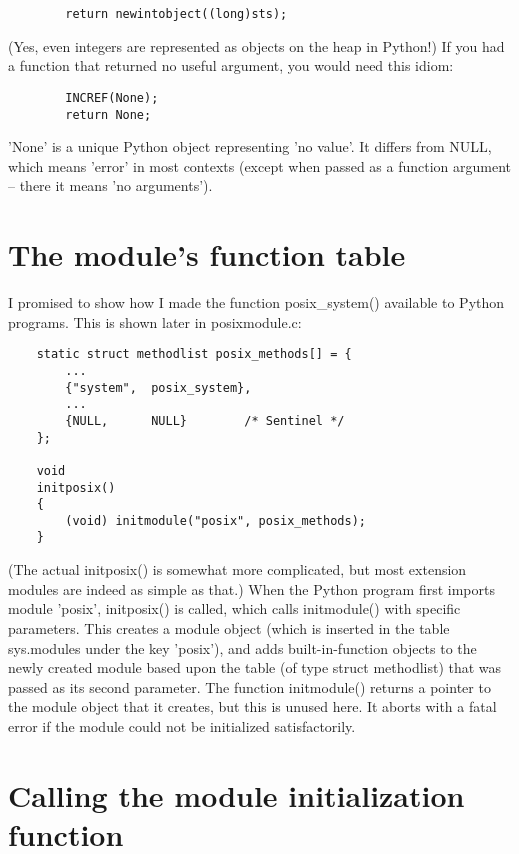 \begin{verbatim}
        return newintobject((long)sts);
\end{verbatim}

(Yes, even integers are represented as objects on the heap in Python!)
If you had a function that returned no useful argument, you would need
this idiom:

\begin{verbatim}
        INCREF(None);
        return None;
\end{verbatim}

'None' is a unique Python object representing 'no value'.  It differs
from NULL, which means 'error' in most contexts (except when passed as
a function argument -- there it means 'no arguments').


\section{The module's function table}

I promised to show how I made the function posix_system() available to
Python programs.  This is shown later in posixmodule.c:

\begin{verbatim}
    static struct methodlist posix_methods[] = {
        ...
        {"system",  posix_system},
        ...
        {NULL,      NULL}        /* Sentinel */
    };

    void
    initposix()
    {
        (void) initmodule("posix", posix_methods);
    }
\end{verbatim}

(The actual initposix() is somewhat more complicated, but most
extension modules are indeed as simple as that.)  When the Python
program first imports module 'posix', initposix() is called, which
calls initmodule() with specific parameters.  This creates a module
object (which is inserted in the table sys.modules under the key
'posix'), and adds built-in-function objects to the newly created
module based upon the table (of type struct methodlist) that was
passed as its second parameter.  The function initmodule() returns a
pointer to the module object that it creates, but this is unused here.
It aborts with a fatal error if the module could not be initialized
satisfactorily.


\section{Calling the module initialization function}

